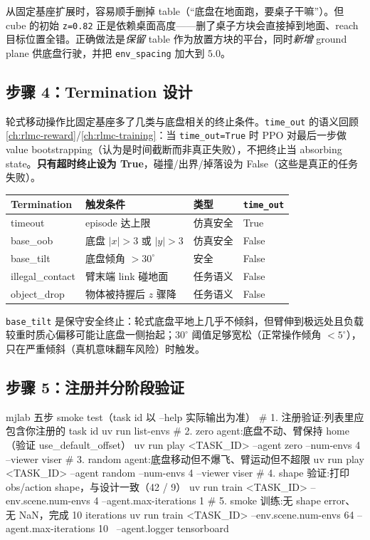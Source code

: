 \begin{note}[保留桌子：cube 初始 \texttt{z=0.82} 依赖桌面高度]
从固定基座扩展时，容易顺手删掉 table（“底盘在地面跑，要桌子干嘛”）。但 cube 的初始 \verb|z=0.82| 正是依赖桌面高度——删了桌子方块会直接掉到地面、reach 目标位置全错。正确做法是\emph{保留} table 作为放置方块的平台，同时\emph{新增} ground plane 供底盘行驶，并把 \verb|env_spacing| 加大到 $5.0$。
\end{note}

\subsection{步骤 4：Termination 设计}
\label{sec:rlmc-wh-termination}

轮式移动操作比固定基座多了几类与底盘相关的终止条件。\verb|time_out| 的语义回顾 \cref{ch:rlmc-reward}/\cref{ch:rlmc-training}：当 \verb|time_out=True| 时 PPO 对最后一步做 value bootstrapping（认为是时间截断而非真正失败），不把终止当 absorbing state。\textbf{只有超时终止设为 True}，碰撞/出界/掉落设为 False（这些是真正的任务失败）。

\begin{center}
\small
\begin{tabular}{@{}llll@{}}
\toprule
Termination & 触发条件 & 类型 & \verb|time_out| \\
\midrule
timeout & episode 达上限 & 仿真安全 & True \\
base\_oob & 底盘 $|x|>3$ 或 $|y|>3$ & 仿真安全 & False \\
base\_tilt & 底盘倾角 $>30^\circ$ & 安全 & False \\
illegal\_contact & 臂末端 link 碰地面 & 任务语义 & False \\
object\_drop & 物体被持握后 $z$ 骤降 & 任务语义 & False \\
\bottomrule
\end{tabular}
\end{center}

\verb|base_tilt| 是保守安全终止：轮式底盘平地上几乎不倾斜，但臂伸到极远处且负载较重时质心偏移可能让底盘一侧抬起；$30^\circ$ 阈值足够宽松（正常操作倾角 $<5^\circ$），只在严重倾斜（真机意味翻车风险）时触发。

\subsection{步骤 5：注册并分阶段验证}
\label{sec:rlmc-wh-verify}

\begin{codebox}[bash]{mjlab 五步 smoke test（task id 以 --help 实际输出为准）}
# 1. 注册验证:列表里应包含你注册的 task id
uv run list-envs
# 2. zero agent:底盘不动、臂保持 home（验证 use_default_offset）
uv run play <TASK_ID> --agent zero --num-envs 4 --viewer viser
# 3. random agent:底盘移动但不爆飞、臂运动但不超限
uv run play <TASK_ID> --agent random --num-envs 4 --viewer viser
# 4. shape 验证:打印 obs/action shape，与设计一致（42 / 9）
uv run train <TASK_ID> --env.scene.num-envs 4 --agent.max-iterations 1
# 5. smoke 训练:无 shape error、无 NaN，完成 10 iterations
uv run train <TASK_ID> --env.scene.num-envs 64 --agent.max-iterations 10 \
  --agent.logger tensorboard
\end{codebox}

